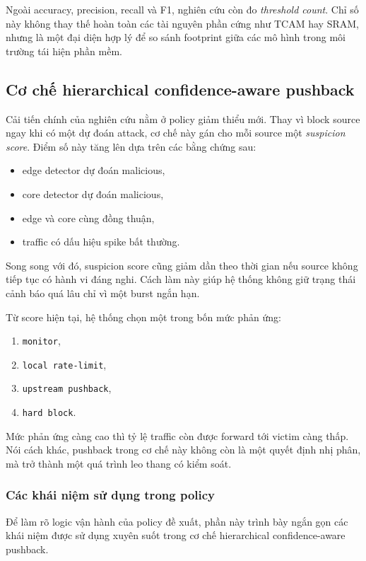 Ngoài accuracy, precision, recall và F1, nghiên cứu còn đo \textit{threshold count}. Chỉ số này không thay thế hoàn toàn các tài nguyên phần cứng như TCAM hay SRAM, nhưng là một đại diện hợp lý để so sánh footprint giữa các mô hình trong môi trường tái hiện phần mềm.

\subsection{Cơ chế hierarchical confidence-aware pushback}

Cải tiến chính của nghiên cứu nằm ở policy giảm thiểu mới. Thay vì block source ngay khi có một dự đoán attack, cơ chế này gán cho mỗi source một \textit{suspicion score}. Điểm số này tăng lên dựa trên các bằng chứng sau:
\begin{itemize}
\item edge detector dự đoán malicious,
\item core detector dự đoán malicious,
\item edge và core cùng đồng thuận,
\item traffic có dấu hiệu spike bất thường.
\end{itemize}

Song song với đó, suspicion score cũng giảm dần theo thời gian nếu source không tiếp tục có hành vi đáng nghi. Cách làm này giúp hệ thống không giữ trạng thái cảnh báo quá lâu chỉ vì một burst ngắn hạn.

Từ score hiện tại, hệ thống chọn một trong bốn mức phản ứng:
\begin{enumerate}
\item \texttt{monitor},
\item \texttt{local rate-limit},
\item \texttt{upstream pushback},
\item \texttt{hard block}.
\end{enumerate}

Mức phản ứng càng cao thì tỷ lệ traffic còn được forward tới victim càng thấp. Nói cách khác, pushback trong cơ chế này không còn là một quyết định nhị phân, mà trở thành một quá trình leo thang có kiểm soát.

\subsubsection{Các khái niệm sử dụng trong policy}

Để làm rõ logic vận hành của policy đề xuất, phần này trình bày ngắn gọn các khái niệm được sử dụng xuyên suốt trong cơ chế hierarchical confidence-aware pushback.

